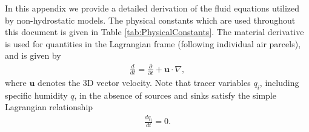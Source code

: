 \documentclass[gmd, manuscript]{copernicus}
\newcommand{\vb}{\mathbf}
\newcommand{\diff}[2]{\frac{d #1}{d #2}}
\newcommand{\pdiff}[2]{\frac{\partial #1}{\partial #2}}
\begin{document}
In this appendix we provide a detailed derivation of the fluid equations utilized by non-hydrostatic models.  The physical constants which are used throughout this document is given in Table \ref{tab:PhysicalConstants}.  The material derivative is used for  quantities in the Lagrangian frame (following individual air parcels), and is given by
\begin{align}
\diff{}{t} = \pdiff{}{t} + \vb{u} \cdot \nabla,
\end{align} where $\vb{u}$ denotes the 3D vector velocity.  Note that tracer variables $q_i$, including specific humidity $q$, in the absence of sources and sinks satisfy the simple Lagrangian relationship
\begin{align} \label{eq:TracerTransport}
\diff{q_i}{t} = 0.
\end{align}  
\end{document}
